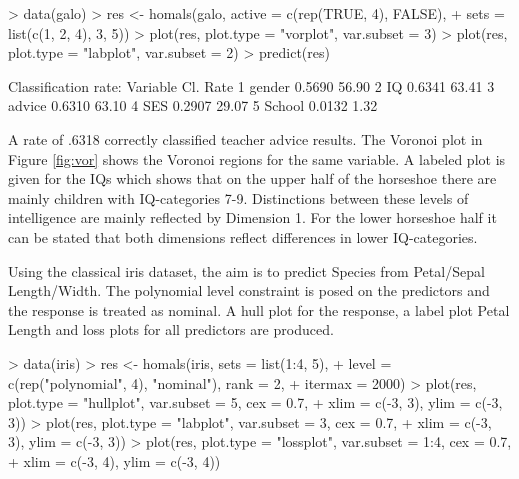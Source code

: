 \documentclass[article]{jss1}
\begin{document}
\begin{Schunk}
\begin{Sinput}
> data(galo)
> res <- homals(galo, active = c(rep(TRUE, 4), FALSE),
+ sets = list(c(1, 2, 4), 3, 5))
> plot(res, plot.type = "vorplot", var.subset = 3)
> plot(res, plot.type = "labplot", var.subset = 2)
> predict(res)
\end{Sinput}
\begin{Soutput}
Classification rate:
  Variable Cl. Rate %
1   gender   0.5690     56.90
2       IQ   0.6341     63.41
3   advice   0.6310     63.10
4      SES   0.2907     29.07
5   School   0.0132      1.32
\end{Soutput}
\end{Schunk}

A rate of .6318 correctly classified teacher advice results. The Voronoi plot in Figure \ref{fig:vor} shows the Voronoi regions for the same variable. A labeled plot is given for the IQs which shows that on the upper half of the horseshoe there are mainly children with IQ-categories 7-9. Distinctions between these levels of intelligence are mainly reflected by Dimension 1. For the lower horseshoe half it can be stated that both dimensions reflect differences in lower IQ-categories.

Using the classical iris dataset, the aim is to predict Species from Petal/Sepal Length/Width. The polynomial level constraint is posed on the predictors and the response is treated as nominal. A hull plot for the response, a label plot Petal Length and loss plots for all predictors are produced.

\begin{Schunk}
\begin{Sinput}
> data(iris)
> res <- homals(iris, sets = list(1:4, 5),
+ level = c(rep("polynomial", 4), "nominal"), rank = 2,
+ itermax = 2000)
> plot(res, plot.type = "hullplot", var.subset = 5, cex = 0.7,
+ xlim = c(-3, 3), ylim = c(-3, 3))
> plot(res, plot.type = "labplot", var.subset = 3, cex = 0.7,
+	xlim = c(-3, 3), ylim = c(-3, 3))
> plot(res, plot.type = "lossplot", var.subset = 1:4, cex = 0.7,
+	xlim = c(-3, 4), ylim = c(-3, 4))
\end{Sinput}
\end{Schunk}
\end{document}
